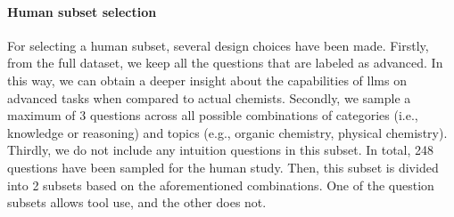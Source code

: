 \paragraph{Human subset selection}

For selecting a human subset, several design choices have been made. Firstly, from the full dataset, we keep all the questions that are labeled as advanced. In this way, we can obtain a deeper insight about the capabilities of \glspl{llm} on advanced tasks
when compared to actual chemists. Secondly, we sample a maximum of 3 questions across all possible combinations of categories (i.e., knowledge or reasoning) and topics (e.g., organic chemistry, physical chemistry). Thirdly, we do not include any intuition questions
in this subset. In total, 248 questions have been sampled for the human study. Then, this subset is divided into 2 subsets based on the aforementioned combinations. One of the question subsets allows tool use, and the other does not.
